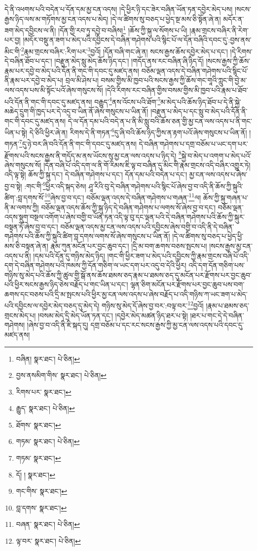 དེ་ནི་འཕགས་པའི་བདེན་པ་དོན་དམ་མྱ་ངན་འདས། །དེ་ཕྱིར་ཉི་དང་ཟེར་བཞིན་ཡོན་ཏན་དབྱེར་མེད་པས། །སངས་རྒྱས་ཉིད་ལས་མ་གཏོགས་མྱ་ངན་འདས་པ་མེད། །དེ་ལ་ཚིགས་སུ་བཅད་པ་ཕྱེད་སྔ་མས་ཅི་སྟོན་ཞེ་ན། མདོར་ན་ཟག་མེད་དབྱིངས་ལ་ནི། །དོན་གྱི་རབ་ཏུ་དབྱེ་བ་བཞིས།\footnote{བཞིན།  སྣར་ཐང་།  པེ་ཅིན། } །ཆོས་ཀྱི་སྐུ་ལ་སོགས་པ་ཡི། །རྣམ་གྲངས་བཞིར་ནི་རེག་པར་བྱ། །མདོར་བསྡུ་ན་ཟག་པ་མེད་པའི་དབྱིངས་དེ་བཞིན་གཤེགས་པའི་སྙིང་པོ་ལ་དོན་བཞིའི་དབང་དུ་:བྱས་ནས་མིང་གི་\footnote{བྱས་ནསམིག་གིས་  སྣར་ཐང་།  པེ་ཅིན། }རྣམ་གྲངས་བཞིར་:རིག་པར་\footnote{རིགས་པར་  སྣར་ཐང་། }བྱའོ། །དོན་བཞི་གང་ཞེ་ན། སངས་རྒྱས་ཆོས་དབྱེར་མེད་པ་དང་། །དེ་རིགས་དེ་བཞིན་ཐོབ་པ་དང་། །བརྫུན་མེད་སླུ་མེད་ཆོས་ཉིད་དང་། །གདོད་ནས་རང་བཞིན་ཞི་ཉིད་དོ། །སངས་རྒྱས་ཀྱི་ཆོས་རྣམ་པར་དབྱེ་བ་མེད་པའི་དོན་ནི་གང་གི་དབང་དུ་མཛད་ནས། བཅོམ་ལྡན་འདས་དེ་བཞིན་གཤེགས་པའི་སྙིང་པོ་ནི་རྣམ་པར་དབྱེ་བ་མེད་པ། བྲལ་མི་ཤེས་པ། བསམ་གྱིས་མི་ཁྱབ་པའི་སངས་རྒྱས་ཀྱི་ཆོས་གང་གཱའི་ཀླུང་གི་བྱེ་མ་ལས་འདས་པས་མི་སྟོང་པའོ་ཞེས་གསུངས་སོ། །དེའི་རིགས་རང་བཞིན་གྱིས་བསམ་གྱིས་མི་ཁྱབ་པའི་རྣམ་པ་ཐོབ་པའི་དོན་ནི་གང་གི་དབང་དུ་མཛད་ནས། བརྒྱུད་\footnote{རྒྱུད་  སྣར་ཐང་།  པེ་ཅིན། }ནས་འོངས་པའི་ཐོག་\footnote{ཐོགས་  སྣར་ཐང་། }མ་མེད་པའི་ཆོས་ཉིད་ཐོབ་པ་དེ་ནི་སྐྱེ་མཆེད་དྲུག་གི་ཁྱད་པར་དེ་འདྲ་བ་ཡིན་ནོ་ཞེས་གསུངས་པ་ཡིན་ནོ། །བརྫུན་པ་མེད་པ་དང་སླུ་བ་མེད་པའི་དོན་ནི་གང་གི་དབང་དུ་མཛད་ནས། དེ་ལ་དོན་དམ་པའི་བདེ་ན་པ་ནི་མི་སླུ་བའི་ཆོས་ཅན་གྱི་མྱ་ངན་ལས་འདས་པ་ནི་གང་ཡིན་པ་སྟེ། དེ་ཅིའི་ཕྱིར་ཞེ་ན། རིགས་དེ་ནི་གཏན་\footnote{གཏམ་  སྣར་ཐང་།  པེ་ཅིན། }དུ་ཞི་བའི་ཆོས་ཉིད་ཀྱིས་ན་རྟག་པའོ་ཞེས་གསུངས་པ་ཡིན་ནོ། །གཏན་\footnote{གཏམ་  སྣར་ཐང་། }དུ་ཉེ་བར་ཞི་བའི་དོན་ནི་གང་གི་དབང་དུ་མཛད་ནས། དེ་བཞིན་གཤེགས་པ་དགྲ་བཅོམ་པ་ཡང་དག་པར་རྫོགས་པའི་སངས་རྒྱས་ནི་གདོད་མ་ནས་ཡོངས་སུ་མྱ་ངན་ལས་འདས་པ་ཉིད་དེ། \footnote{དོ། །   སྣར་ཐང་། }སྐྱེ་བ་མེད་པ་འགག་པ་མེད་པའོ་ཞེས་གསུངས་སོ། །དོན་བཞི་པོ་འདི་དག་ལ་ནི་གོ་རིམས་ཇི་ལྟ་བ་བཞིན་དུ་མིང་གི་རྣམ་གྲངས་འདི་བཞིར་འགྱུར་ཏེ། འདི་ལྟ་སྟེ། ཆོས་ཀྱི་སྐུ་དང་། དེ་བཞིན་གཤེགས་པ་དང་། དོན་དམ་པའི་བདེན་པ་དང་། མྱ་ངན་ལས་འདས་པ་ཞེས་བྱ་བ་སྟེ། :གང་གི་\footnote{གང་གིས་  སྣར་ཐང་། }ཕྱིར་འདི་སྐད་ཅེས། ཤཱ་རིའི་བུ་དེ་བཞིན་གཤེགས་པའི་སྙིང་པོ་ཞེས་བྱ་བ་འདི་ནི་ཆོས་ཀྱི་སྐུའི་ཚིག་:བླ་དགས་སོ་\footnote{བླ་དགས་  སྣར་ཐང་། }ཞེས་བྱ་བ་དང་། བཅོམ་ལྡན་འདས་དེ་བཞིན་གཤེགས་པ་གཞན་\footnote{བཞན་  སྣར་ཐང་།  པེ་ཅིན། }ལ། ཆོས་ཀྱི་སྐུ་གཞན་པ་ནི་མ་ལགས་ཀྱི། བཅོམ་ལྡན་འདས་ཆོས་ཀྱི་སྐུ་ཉིད་དེ་བཞིན་གཤེགས་པ་ལགས་སོ་ཞེས་བྱ་བ་དང་། བཅོམ་ལྡན་འདས་སྡུག་བསྔལ་འགོག་པ་ཞེས་བགྱི་བ་ཡོན་ཏན་འདི་ལྟ་བུ་དང་ལྡན་པའི་དེ་བཞིན་གཤེགས་པའི་ཆོས་ཀྱི་སྐུར་བསྟན་ཏོ་ཞེས་བྱ་བ་དང་། བཅོམ་ལྡན་འདས་མྱ་ངན་ལས་འདས་པའི་དབྱིངས་ཞེས་བགྱི་བ་འདི་ནི་དེ་བཞིན་གཤེགས་པའི་ཆོས་ཀྱི་སྐུའི་ཚིག་བླ་དགས་ལགས་སོ་ཞེས་གསུངས་པ་ཡིན་ནོ། །དེ་ལ་ཚིགས་སུ་བཅད་པ་ཕྱེད་ཕྱི་མས་ཅི་བསྟན་ཞེ་ན། རྣམ་ཀུན་མངོན་པར་བྱང་ཆུབ་དང་། །དྲི་མ་བག་ཆགས་བཅས་སྤངས་པ། །སངས་རྒྱས་མྱ་ངན་འདས་པ་ནི། །དམ་པའི་དོན་དུ་གཉིས་མེད་ཉིད། །གང་གི་ཕྱིར་ཟག་པ་མེད་པའི་དབྱིངས་ཀྱི་རྣམ་གྲངས་བཞི་པོ་འདི་དག་དེ་བཞིན་གཤེགས་པའི་ཁམས་ཀྱི་དོན་གཅིག་ལ་ཡང་དག་པར་འདུ་བ་དེའི་ཕྱིར། འདི་དག་དོན་གཅིག་པས་གཉིས་སུ་མེད་པའི་ཆོས་ཀྱི་ཚུལ་གྱི་སྒོ་ནས་ཆོས་ཐམས་ཅད་རྣམ་པ་ཐམས་ཅད་དུ་མངོན་པར་རྫོགས་པར་བྱང་ཆུབ་པའི་ཕྱིར་སངས་རྒྱས་ཉིད་ཅེས་བརྗོད་པ་གང་ཡིན་པ་དང་། ལྷན་ཅིག་མངོན་པར་རྫོགས་པར་བྱང་ཆུབ་པས་བག་ཆགས་དང་བཅས་པའི་དྲི་མ་སྤངས་པའི་ཕྱིར་མྱ་ངན་ལས་འདས་པ་ཞེས་བརྗོད་པ་འདི་གཉིས་ཀ་ཡང་ཟག་པ་མེད་པའི་དབྱིངས་ལ་དབྱེར་མེད་བཅད་དུ་མེད་དེ། གཉིས་སུ་མེད་དོ་ཞེས་བྱ་བར་:བལྟ་བར་\footnote{ལྟ་བར་  སྣར་ཐང་།  པེ་ཅིན། }བྱའོ། །རྣམ་པ་ཐམས་ཅད་གྲངས་མེད་པ། །བསམ་མེད་དྲི་མེད་ཡོན་ཏན་དང་། །དབྱེར་མེད་མཚན་ཉིད་ཐར་པ་སྟེ། །ཐར་པ་གང་དེ་དེ་བཞིན་གཤེགས། །ཞེས་བྱ་བ་འདི་ནི་ཇི་སྐད་དུ། དགྲ་བཅོམ་པ་དང་རང་སངས་རྒྱས་ཀྱི་མྱ་ངན་ལས་འདས་པའི་དབང་དུ་མཛད་ནས། 